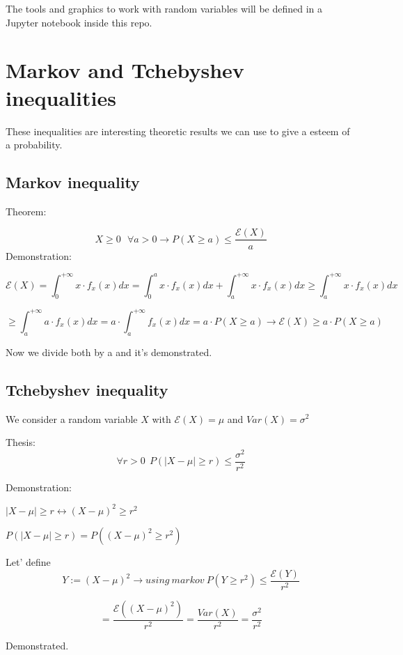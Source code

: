 \documentclass{article}
\begin{document}
The tools and graphics to work with random variables will be defined in a Jupyter notebook inside this repo.

\section{Markov and Tchebyshev inequalities}

These inequalities are interesting theoretic results we can use to give a esteem of a probability.
\bigskip

\subsection{Markov inequality}

Theorem:
\bigskip

$$X \geq 0 \ \ \  \forall a > 0 \rightarrow P(X \geq a) \leq \frac{\mathcal E(X)}{a}$$
\bigskip
Demonstration:

$$\mathcal E(X) = \int_{0}^{+ \infty} x \cdot f_x(x)dx = \int_{0}^ax\cdot f_x(x)dx + \int_{a}^{+ \infty} x \cdot f_x(x)dx \geq \int_{a}^{+ \infty} x \cdot f_x(x)dx$$

\bigskip 

$$\geq \int_{a}^{+ \infty} a \cdot f_x(x)dx = a \cdot \int_{a}^{+ \infty} f_x(x)dx = a \cdot P(X \geq a) \longrightarrow \mathcal E(X) \geq a \cdot P(X \geq a)$$

Now we divide both by a and it's demonstrated.

\subsection{Tchebyshev inequality}

We consider a random variable $X$ with $\mathcal E(X) = \mu$ and $Var(X) = \sigma^2$

Thesis:
$$\forall r > 0 \ \ P(|X - \mu| \geq r) \leq \frac{\sigma^2}{r^2}$$
\bigskip

Demonstration:

$|X - \mu| \geq r \leftrightarrow (X - \mu)^2 \geq r^2$
\bigskip

$P(|X - \mu| \geq r) = P((X - \mu)^2 \geq r^2)$

Let' define $$Y:= (X - \mu)^2 \rightarrow using \ markov \ P(Y \geq r^2) \leq \frac{\mathcal E(Y)}{r^2}$$

$$= \frac{\mathcal E((X- \mu)^2)}{r^2} = \frac{Var(X)}{r^2} = \frac{\sigma^2}{r^2}$$

Demonstrated.
\end{document}
